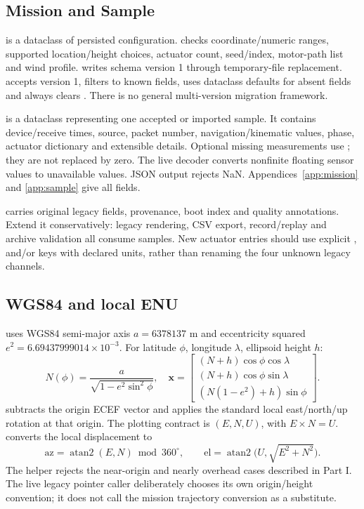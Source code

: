 \subsection{Mission and Sample}
 is a dataclass of persisted configuration. 
checks coordinate/numeric ranges, supported location/height choices, actuator
count, seed/index, motor-path list and wind profile.  writes schema
version 1 through temporary-file replacement.  accepts version 1,
filters to known fields, uses dataclass defaults for absent fields and always
clears . There is no general multi-version migration
framework.

 is a dataclass representing one accepted or imported sample.
It contains device/receive times, source, packet number, navigation/kinematic
values, phase, actuator dictionary and extensible details. Optional missing
measurements use ; they are not replaced by zero. The live decoder
converts nonfinite floating sensor values to unavailable values. JSON output
rejects NaN. Appendices~\ref{app:mission} and \ref{app:sample} give all fields.

 carries original legacy fields, provenance, boot index and
quality annotations. Extend it conservatively: legacy rendering, CSV export,
record/replay and archive validation all consume samples. New actuator entries
should use explicit ,  and/or  keys with
declared units, rather than renaming the four unknown legacy channels.

\subsection{WGS84 and local ENU}
 uses WGS84 semi-major axis \(a=6378137\) m and eccentricity squared
\(e^2=6.69437999014\times10^{-3}\).
For latitude \(\phi\), longitude \(\lambda\), ellipsoid height \(h\):
\[
 N(\phi)=\frac{a}{\sqrt{1-e^2\sin^2\phi}},\quad
 \boldsymbol{x}=\begin{bmatrix}
 (N+h)\cos\phi\cos\lambda\\
 (N+h)\cos\phi\sin\lambda\\
 (N(1-e^2)+h)\sin\phi
 \end{bmatrix}.
\]
 subtracts the origin ECEF vector and applies the standard local
east/north/up rotation at that origin. The plotting contract is
\((E,N,U)\), with \(E\times N=U\).
 converts the local displacement to
\[
 \mathrm{az}=\operatorname{atan2}(E,N)\bmod 360^\circ,\qquad
 \mathrm{el}=\operatorname{atan2}\bigl(U,\sqrt{E^2+N^2}\bigr).
\]
The helper rejects the near-origin and nearly overhead cases described in Part I.
The live legacy pointer caller deliberately chooses its own origin/height
convention; it does not call the mission trajectory conversion as a substitute.

